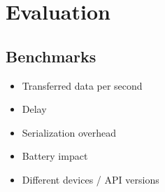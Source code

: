 \section{Evaluation}
\label{sec:evaluation}

\subsection{Benchmarks}
\begin{itemize}[noitemsep]
	\item Transferred data per second
	\item Delay
	\item Serialization overhead
	\item Battery impact
	\item Different devices / API versions
\end{itemize}

\clearpage